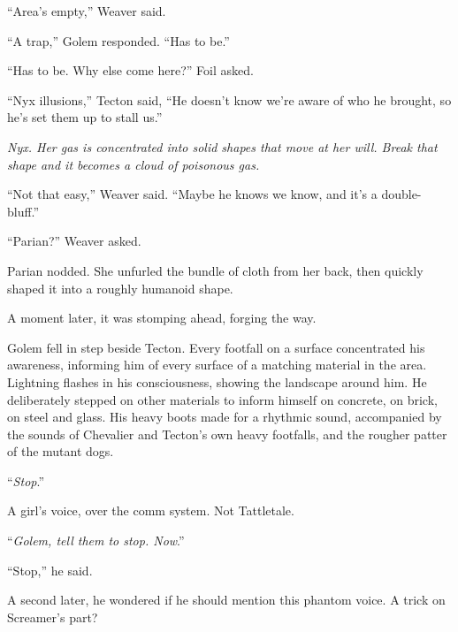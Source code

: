 ``Area's empty,'' Weaver said.



``A trap,'' Golem responded.  ``Has to be.''



``Has to be.  Why else come here?''  Foil asked.



``Nyx illusions,'' Tecton said, ``He doesn't know we're aware of who he brought, so he's set them up to stall us.''



\emph{Nyx.  Her gas is concentrated into solid shapes that move at her will.  Break that shape and it becomes a cloud of poisonous gas.}



``Not that easy,'' Weaver said.  ``Maybe he knows we know, and it's a double-bluff.''



``Parian?'' Weaver asked.



Parian nodded.  She unfurled the bundle of cloth from her back, then quickly shaped it into a roughly humanoid shape.



A moment later, it was stomping ahead, forging the way.



Golem fell in step beside Tecton.  Every footfall on a surface concentrated his awareness, informing him of every surface of a matching material in the area.  Lightning flashes in his consciousness, showing the landscape around him.  He deliberately stepped on other materials to inform himself on concrete, on brick, on steel and glass.  His heavy boots made for a rhythmic sound, accompanied by the sounds of Chevalier and Tecton's own heavy footfalls, and the rougher patter of the mutant dogs.



``\emph{Stop}.''



A girl's voice, over the comm system.  Not Tattletale.



``\emph{Golem, tell them to stop.  Now}.''



``Stop,'' he said.



A second later, he wondered if he should mention this phantom voice.  A trick on Screamer's part?



